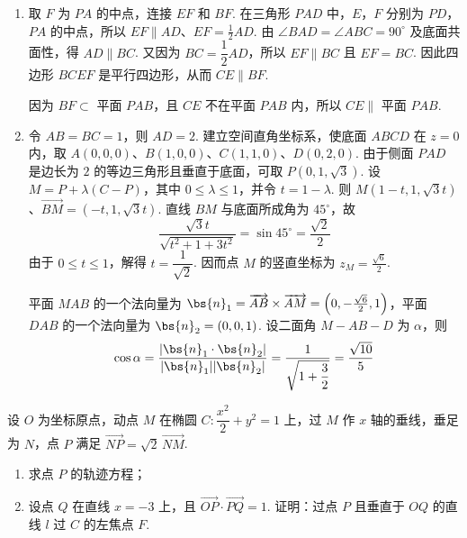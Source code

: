 \begin{solution}
\begin{enumerate}
\item 取 \(F\) 为 \(PA\) 的中点，连接 \(EF\) 和 \(BF\). 在三角形 \(PAD\) 中，\(E\)，\(F\) 分别为 \(PD\)，\(PA\) 的中点，所以
\(EF\parallel AD\)、\(EF=\frac12AD\).
由 \(\angle BAD=\angle ABC=90^\circ\) 及底面共面性，得 \(AD\parallel BC\). 又因为 \(BC=\dfrac12AD\)，所以 \(EF\parallel BC\) 且 \(EF=BC\). 因此四边形 \(BCEF\) 是平行四边形，从而 \(CE\parallel BF\).

因为 \(BF\subset\) 平面 \(PAB\)，且 \(CE\) 不在平面 \(PAB\) 内，所以 \(CE\parallel\) 平面 \(PAB\).

\item 令 \(AB=BC=1\)，则 \(AD=2\). 建立空间直角坐标系，使底面 \(ABCD\) 在 \(z=0\) 内，取 \(A(0,0,0)\)、\(B(1,0,0)\)、\(C(1,1,0)\)、\(D(0,2,0)\).
由于侧面 \(PAD\) 是边长为 \(2\) 的等边三角形且垂直于底面，可取
\(P(0,1,\sqrt3)\).
设 \(M=P+\lambda(C-P)\)，其中 \(0\le\lambda\le1\)，并令 \(t=1-\lambda\). 则
\(M(1-t,1,\sqrt3t)\)、\(\overrightarrow{BM}=(-t,1,\sqrt3t)\).
直线 \(BM\) 与底面所成角为 \(45^\circ\)，故
\[
\frac{\sqrt3t}{\sqrt{t^2+1+3t^2}}=\sin45^\circ=\frac{\sqrt2}{2}
\]
由于 \(0\le t\le1\)，解得 \(t=\dfrac1{\sqrt2}\). 因而点 \(M\) 的竖直坐标为
\(z_M=\frac{\sqrt6}{2}\).

平面 \(MAB\) 的一个法向量为 \(\bs{n}_1=\overrightarrow{AB}\times\overrightarrow{AM}=\left(0,-\frac{\sqrt6}{2},1\right)\)，平面 \(DAB\) 的一个法向量为 \(\bs{n}_2=(0,0,1)\). 设二面角 \(M-AB-D\) 为 \(\alpha\)，则
\[
\cos\alpha=\frac{|\bs{n}_1\cdot\bs{n}_2|}{|\bs{n}_1||\bs{n}_2|}
=\frac1{\sqrt{1+\dfrac32}}=\frac{\sqrt{10}}5
\]
\end{enumerate}
\end{solution}

\begin{problem}
设 \(O\) 为坐标原点，动点 \(M\) 在椭圆 \(C:\dfrac{x^2}{2}+y^2=1\) 上，过 \(M\) 作 \(x\) 轴的垂线，垂足为 \(N\)，点 \(P\) 满足 \(\overrightarrow{NP}=\sqrt2\,\overrightarrow{NM}\).

\begin{enumerate}
\item 求点 \(P\) 的轨迹方程；
\item 设点 \(Q\) 在直线 \(x=-3\) 上，且 \(\overrightarrow{OP}\cdot \overrightarrow{PQ}=1\). 证明：过点 \(P\) 且垂直于 \(OQ\) 的直线 \(l\) 过 \(C\) 的左焦点 \(F\).
\end{enumerate}
\end{problem}

